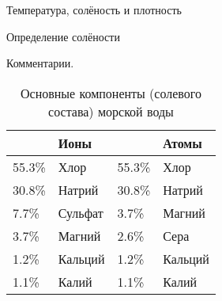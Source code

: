 \begin{chapter}{Температура, солёность и плотность}
\begin{section}{Определение солёности}
\begin{paragraph}{Комментарии.}

\begin{table}
\caption{Основные компоненты (солевого состава) морской воды}
\begin{tabular}{llll}
\hline
 & Ионы	& & Атомы\\
\hline
55.3\% & Хлор & 55.3\% & Хлор \\
30.8\% & Натрий & 30.8\% & Натрий\\
 7.7\% & Сульфат & 3.7\% & Магний\\
 3.7\% & Магний  & 2.6\% & Сера\\
 1.2\% & Кальций & 1.2\% & Кальций\\
 1.1\% & Калий   & 1.1\% & Калий\\
\hline
\end{tabular}
\end{table}
%
\end{paragraph}


\end{section}
\end{chapter}
